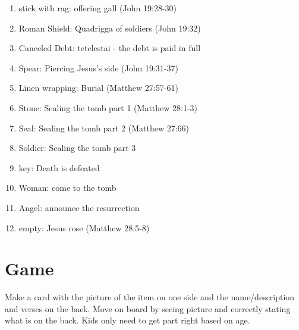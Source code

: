 \begin{enumerate}
\item
stick with rag: offering gall (John 19:28-30)
\item
Roman Shield: Quadrigga of soldiers (John 19:32)
\item
Canceled Debt: tetelestai - the debt is paid in full
\item
Spear: Piercing Jesus's side (John 19:31-37)
\item
Linen wrapping: Burial (Matthew 27:57-61)
\item
Stone: Sealing the tomb part 1 (Matthew 28:1-3)
\item
Seal: Sealing the tomb part 2 (Matthew 27:66)
\item
Soldier: Sealing the tomb part 3
\item
key: Death is defeated
\item
Woman: come to the tomb
\item
Angel: announce the resurrection
\item
empty: Jesus rose (Matthew 28:5-8)
\end{enumerate}


\section{Game}

Make a card with the picture of the item on one side and the name/description and verses on the back.  Move on board by seeing picture and correctly stating what is on the back.  Kids only need to get part right based on age.


